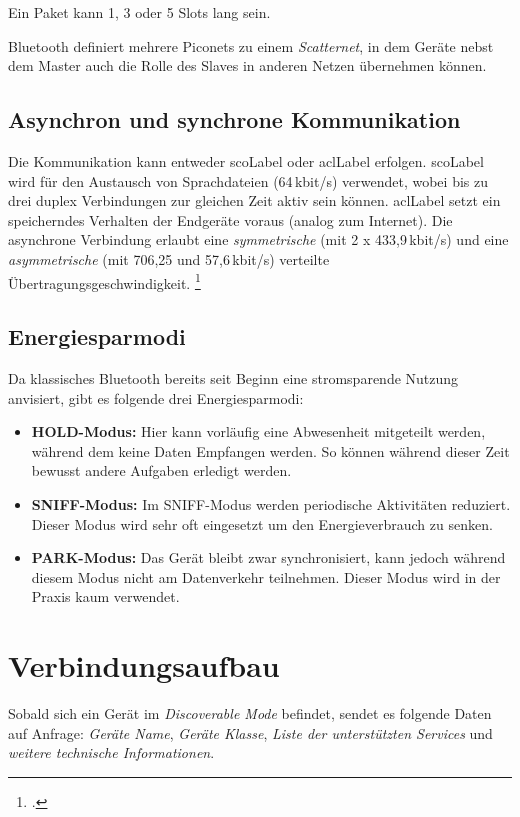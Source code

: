 Ein Paket kann 1, 3 oder 5 Slots lang sein.

Bluetooth definiert mehrere Piconets zu einem \textit{Scatternet}, in dem Geräte nebst dem Master auch die Rolle des Slaves in anderen Netzen übernehmen können.

\subsection{Asynchron und synchrone Kommunikation}
Die Kommunikation kann entweder \gls{scoLabel} oder \gls{aclLabel} erfolgen.
\gls{scoLabel} wird für den Austausch von Sprachdateien (64\,kbit/s) verwendet, wobei bis zu drei duplex Verbindungen zur gleichen Zeit aktiv sein können.
\gls{aclLabel} setzt ein speicherndes Verhalten der Endgeräte voraus (analog zum Internet). Die asynchrone Verbindung erlaubt eine \textit{symmetrische} (mit 2 x 433,9\,kbit/s) und eine \textit{asymmetrische} (mit 706,25 und 57,6\,kbit/s) verteilte Übertragungsgeschwindigkeit.
\footcite{Nahfunktechnik_in_Smartphones_FAQ_cio.de_2015-04-24}


\subsection{Energiesparmodi}
\label{subsec:energymode}
Da klassisches Bluetooth bereits seit Beginn eine stromsparende Nutzung anvisiert, gibt es folgende drei Energiesparmodi:
\begin{itemize}
	\item \textbf{HOLD-Modus:} Hier kann vorläufig eine Abwesenheit mitgeteilt werden, während dem keine Daten Empfangen werden. So können während dieser Zeit bewusst andere Aufgaben erledigt werden.
	\item \textbf{SNIFF-Modus:} Im SNIFF-Modus werden periodische Aktivitäten reduziert. Dieser Modus wird sehr oft eingesetzt um den Energieverbrauch zu senken.
	\item \textbf{PARK-Modus:} Das Gerät bleibt zwar synchronisiert, kann jedoch während diesem Modus nicht am Datenverkehr teilnehmen. Dieser Modus wird in der Praxis kaum verwendet.
\end{itemize}


\section{Verbindungsaufbau}
Sobald sich ein Gerät im \textit{Discoverable Mode} befindet, sendet es folgende Daten auf Anfrage: \textit{Geräte Name}, \textit{Geräte Klasse}, \textit{Liste der unterstützten Services} und \textit{weitere technische Informationen}.

